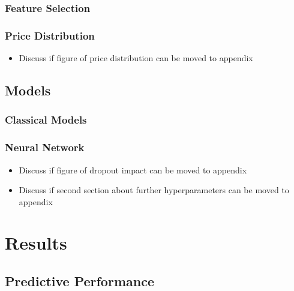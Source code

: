 \documentclass[12pt, letterpaper]{article}
\begin{document}
\subsubsection{Feature Selection} %


\subsubsection{Price Distribution} %

\begin{itemize}
    \item Discuss if figure of price distribution can be moved to appendix
\end{itemize}



\subsection{Models} %

\subsubsection{Classical Models} %

\subsubsection{Neural Network} %

\begin{itemize}
    \item Discuss if figure of dropout impact can be moved to appendix
    \item Discuss if second section about further hyperparameters can be moved to appendix
\end{itemize}



\section{Results} %


\subsection{Predictive Performance} %
\end{document}
